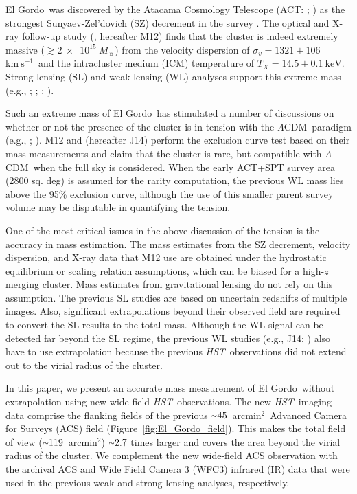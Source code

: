\documentclass[twocolumn]{aastex631}
\newcommand{\elgordo}{El Gordo}
\newcommand{\LCDM}{$\Lambda$CDM}
\newcommand{\HST}{{\it HST}}
\newcommand{\mytilde}{\raise.19ex\hbox{$\scriptstyle\sim$}}
\newcommand{\kms}{$\mbox{km}~\mbox{s}^{-1}$}
\newcommand{\solarmA}{$10^{15}~M_{\sun}$}
\newcommand{\sqarcmin}{arcmin$^{2}$}
\begin{document}
\elgordo~was discovered by the Atacama Cosmology Telescope (ACT: \citealt{Menanteau2010}; \citealt{Marriage2011}) as the strongest Sunyaev-Zel'dovich (SZ) decrement in the survey \citep{Hasselfield2013}. 
The optical and X-ray follow-up study (\citealt{Menanteau2012}, hereafter M12) finds that the cluster is indeed extremely massive ($\gtrsim2~\times$~\solarmA) from the velocity dispersion of $\sigma_v=1321\pm106$~\kms~and the intracluster medium (ICM) temperature of $T_{X} = 14.5\pm0.1~\mbox{keV}$. 
Strong lensing (SL) and weak lensing (WL) analyses support this extreme mass (e.g., \citealt{Zitrin2013}; \citealt{Jee2014}; \citealt{Schrabback2018}; \citealt{Diego2020}). 


Such an extreme mass of \elgordo~has stimulated a number of discussions on whether or not the presence of the cluster is in tension with the \LCDM~paradigm (e.g., \citealt{Harrison2012}; \citealt{Katz2013}). 
M12 and \cite{Jee2014} (hereafter J14) perform the exclusion curve test \citep{Mortonson2011} based on their mass measurements and claim that the cluster is rare, but compatible with \LCDM~when the full sky is considered. 
When the early ACT+SPT survey area (2800 sq. deg) is assumed for the rarity computation, the previous WL mass lies above the 95\% exclusion curve, although the use of this smaller parent survey volume may be disputable in quantifying the tension.

One of the most critical issues in the above discussion of the tension is the accuracy in mass estimation. 
The mass estimates from the SZ decrement, velocity dispersion, and X-ray data that M12 use are obtained under the hydrostatic equilibrium or scaling relation assumptions, which can be biased for a high-$z$ merging cluster. 
Mass estimates from gravitational lensing do not rely on this assumption. 
The previous SL studies are based on uncertain redshifts of multiple images. Also, significant extrapolations beyond their observed field are required to convert the SL results to the total mass. 
Although the WL signal can be detected far beyond the SL regime, the previous WL studies (e.g., J14; \citealt{Schrabback2018}) also have to use extrapolation because the previous \HST~observations did not extend out to the virial radius of the cluster. 


In this paper, we present an accurate mass measurement of \elgordo~without extrapolation using new wide-field \HST~observations.
The new \HST~imaging data comprise the flanking fields of the previous $\mytilde45$~\sqarcmin~Advanced Camera for Surveys (ACS) field (Figure~\ref{fig:El_Gordo_field}). 
This makes the total field of view ($\mytilde119$~\sqarcmin) $\mytilde2.7$ times larger and covers the area beyond the virial radius of the cluster. 
We complement the new wide-field ACS observation with the archival ACS and Wide Field Camera 3 (WFC3) infrared (IR) data that were used in the previous weak and strong lensing analyses, respectively. 
\end{document}
